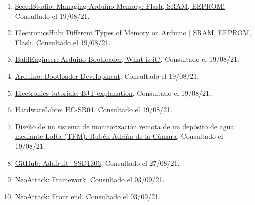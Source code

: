 \documentclass[12pt]{article}
\begin{document}
\begin{enumerate}
			\item 
			\label{bib: seeedstudio arduino memory}
			\href{https://www.seeedstudio.com/blog/2021/04/26/managing-arduino-memory-flash-sram-eeprom/}{SeeedStudio: Managing Arduino Memory: Flash, SRAM, EEPROM!}. Consultado el 19/08/21.	
				
			\item 
			\label{bib: electronicsHub arduino memory}
			\href{https://www.electronicshub.org/types-of-memory-on-arduino/#Volatile_vs_Non-Volatile}{ElectronicsHub: Different Types of Memory on Arduino $\vert$ SRAM, EEPROM, Flash}. Consultado el 19/08/21.

			\item 
			\label{bib: baldEngineer arduino bootloader}
			\href{https://www.baldengineer.com/arduino-bootloader.html}{BaldEngineer: Arduino Bootloader, What is it?}. Consultado el 19/08/21.	
			
			\item 
			\label{bib: Arduino cc  bootloader}
			\href{https://www.arduino.cc/en/hacking/bootloader}{Arduino: Bootloader Development}. Consultado el 19/08/21.
			
			\item
			\label{electronics tutos bjt}
			\href{https://www.electronics-tutorials.ws/transistor/tran_1.html}{Electronics tutorials: BJT explanation}. Consultado el 19/08/21.
			
			\item
			\label{hwlibre hc-sr04}
			\href{https://www.hwlibre.com/hc-sr04/}{HardwareLibre: HC-SR04}. Consultado el 19/08/21.	
			
			\item 
			\label{TFM LoRa}
			\href{http://openaccess.uoc.edu/webapps/o2/bitstream/10609/97127/8/radriandTFM0619memoria.pdf}{Diseño de un sistema de monitorización remota de un depósito de agua mediante LoRa (TFM). Rubén Adrián de la Cámara}. Consultado el 19/08/21.

			\item
			\label{adafruit library}
			\href{https://github.com/adafruit/Adafruit_SSD1306}{GitHub: Adafruit\_SSD1306}. Consultado el 27/08/21.
			
			\item
			\label{neoattack framework}
			\href{https://neoattack.com/neowiki/framework/}{NeoAttack: Framework}. Consultado el 03/09/21.
			
			\item
			\label{bib: neoattack front end}
			\href{https://neoattack.com/neowiki/front-end/}{NeoAttack: Front end}. Consultado el 03/09/21.
			

\end{enumerate}
\end{document}
